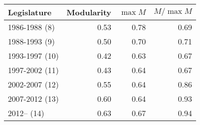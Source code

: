 \begin{tabular}{lrrr}
  \hline
Legislature & Modularity & $\max{M}$ & $M / \max{M}$ \\ 
  \hline
1986-1988 (8) & 0.53 & 0.78 & 0.69 \\ 
  1988-1993 (9) & 0.50 & 0.70 & 0.71 \\ 
  1993-1997 (10) & 0.42 & 0.63 & 0.67 \\ 
  1997-2002 (11) & 0.43 & 0.64 & 0.67 \\ 
  2002-2007 (12) & 0.55 & 0.64 & 0.86 \\ 
  2007-2012 (13) & 0.60 & 0.64 & 0.93 \\ 
  2012-- (14) & 0.63 & 0.67 & 0.94 \\ 
   \hline
\end{tabular}
